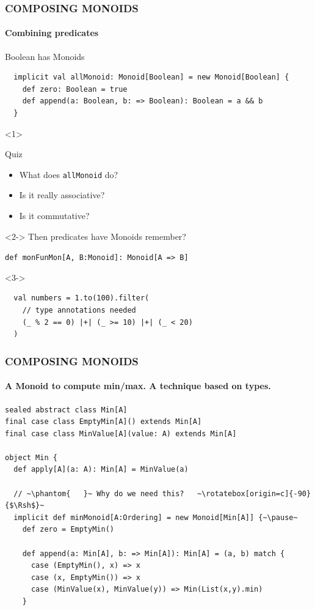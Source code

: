 \documentclass{beamer}
\begin{document}
\begin{frame}[fragile] \frametitle{COMPOSING MONOIDS}
  \framesubtitle{Combining predicates}
  \begin{block}{Boolean has Monoids}
  \begin{lstlisting}
  implicit val allMonoid: Monoid[Boolean] = new Monoid[Boolean] {
    def zero: Boolean = true
    def append(a: Boolean, b: => Boolean): Boolean = a && b
  }
  \end{lstlisting}
  \end{block}

  \begin{onlyenv}<1>
  \begin{block}{Quiz}
    \begin{itemize}
      \item What does \texttt{allMonoid} do?
      \item Is it really associative?
      \item Is it commutative?
    \end{itemize}
  \end{block}
  \end{onlyenv}

  \begin{visibleenv}<2->
    Then predicates have Monoids remember?

    \texttt{def monFunMon[A, B:Monoid]: Monoid[A => B]}
  \end{visibleenv}

  \begin{visibleenv}<3->
  \begin{block}{}
  \begin{lstlisting}
  val numbers = 1.to(100).filter(
    // type annotations needed
    (_ % 2 == 0) |+| (_ >= 10) |+| (_ < 20)
  )
  \end{lstlisting}
  \end{block}
  \end{visibleenv}
\end{frame}

\begin{frame}[fragile] \frametitle{COMPOSING MONOIDS}
  \framesubtitle{A Monoid to compute min/max. A technique based on types.}
  \begin{block}{}
  \begin{lstlisting}
sealed abstract class Min[A]
final case class EmptyMin[A]() extends Min[A]
final case class MinValue[A](value: A) extends Min[A]

object Min {
  def apply[A](a: A): Min[A] = MinValue(a)

  // ~\phantom{   }~ Why do we need this?   ~\rotatebox[origin=c]{-90}{$\Rsh$}~
  implicit def minMonoid[A:Ordering] = new Monoid[Min[A]] {~\pause~
    def zero = EmptyMin()

    def append(a: Min[A], b: => Min[A]): Min[A] = (a, b) match {
      case (EmptyMin(), x) => x
      case (x, EmptyMin()) => x
      case (MinValue(x), MinValue(y)) => Min(List(x,y).min)
    }
  \end{lstlisting}
  \end{block}
\end{frame}
\end{document}
